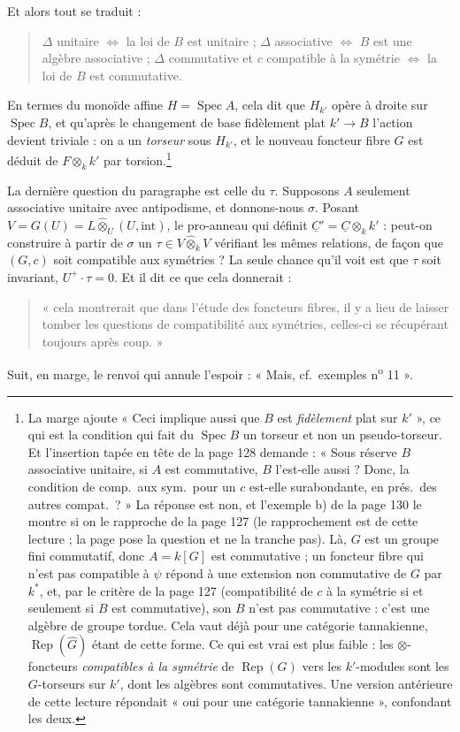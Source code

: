 \documentclass[11pt,a4paper]{article}
\begin{document}
Et alors tout se traduit :
\begin{quote}
$\Delta$ unitaire $\Leftrightarrow$ la loi de $B$ est unitaire ; $\Delta$
associative $\Leftrightarrow$ $B$ est une algèbre associative ; $\Delta$
commutative et $c$ compatible à la symétrie $\Leftrightarrow$ la loi de $B$ est
commutative.
\end{quote}
En termes du monoïde affine $H = \operatorname{Spec}A$, cela dit que $H_{k'}$
opère à droite sur $\operatorname{Spec}B$, et qu'après le changement de base
fidèlement plat $k' \to B$ l'action devient triviale : on a un
\emph{torseur} sous $H_{k'}$, et le nouveau foncteur fibre $G$ est déduit de
$F \otimes_{k} k'$ par torsion.\footnote{La marge ajoute « Ceci implique aussi
que $B$ est \emph{fidèlement} plat sur $k'$ », ce qui est la condition qui fait
du $\operatorname{Spec}B$ un torseur et non un pseudo-torseur. Et l'insertion
tapée en tête de la page 128 demande : « Sous réserve $B$ associative unitaire,
si $A$ est commutative, $B$ l'est-elle aussi ? Donc, la condition de comp.\ aux
sym.\ pour un $c$ est-elle surabondante, en prés.\ des autres compat.\ ? » La
réponse est non, et l'exemple b) de la page 130 le montre si on le rapproche
de la page 127 (le rapprochement est de cette lecture ; la page pose la
question et ne la tranche pas). Là, $G$ est un groupe fini commutatif, donc
$A = k[G]$ est commutative ; un foncteur fibre qui n'est pas compatible à
$\psi$ répond à une extension non commutative de $G$ par $k^{*}$, et, par le
critère de la page 127 (compatibilité de $c$ à la symétrie si et seulement si
$B$ est commutative), son $B$ n'est pas commutative : c'est une algèbre de
groupe tordue. Cela vaut déjà pour une catégorie tannakienne,
$\operatorname{Rep}(\widehat{G})$ étant de cette forme. Ce qui est vrai est
plus faible : les $\otimes$-foncteurs \emph{compatibles à la symétrie} de
$\operatorname{Rep}(G)$ vers les $k'$-modules sont les $G$-torseurs sur $k'$,
dont les algèbres sont commutatives. Une version antérieure de cette lecture
répondait « oui pour une catégorie tannakienne », confondant les deux.}

La dernière question du paragraphe est celle du $\tau$. Supposons $A$
seulement associative unitaire avec antipodisme, et donnons-nous $\sigma$.
Posant $V = G(U) = L \mathbin{\widehat{\otimes}}_{U} (U, \mathrm{int})$, le
pro-anneau qui définit $\underline{C}' = \underline{C} \otimes_{k} k'$ :
peut-on construire à partir de $\sigma$ un
$\tau \in V \mathbin{\widehat{\otimes}}_{k} V$ vérifiant les mêmes relations,
de façon que $(G,c)$ soit compatible aux symétries ? La seule chance qu'il voit
est que $\tau$ soit invariant, $U^{+}\!\cdot\tau = 0$. Et il dit ce que cela
donnerait :
\begin{quote}
« cela montrerait que dans l'étude des foncteurs fibres, il y a lieu de laisser
tomber les questions de compatibilité aux symétries, celles-ci se récupérant
toujours après coup. »
\end{quote}
Suit, en marge, le renvoi qui annule l'espoir : « Mais, cf.\ exemples
n\textsuperscript{o} 11 ».
\end{document}

